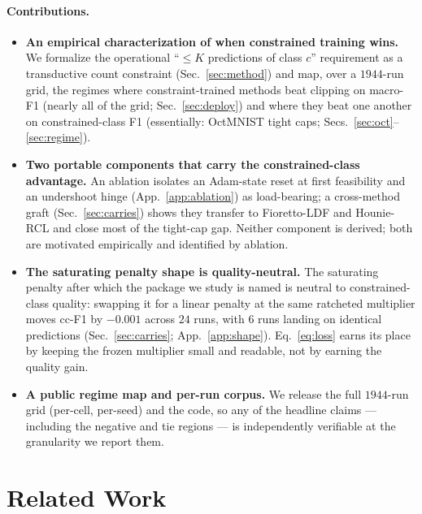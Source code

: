 \documentclass[10pt]{article}
\begin{document}
\paragraph{Contributions.}
\begin{itemize}\itemsep2pt
  \item \textbf{An empirical characterization of when constrained training
  wins.} We formalize the operational ``$\le K$ predictions of class $c$''
  requirement as a transductive count constraint (Sec.~\ref{sec:method}) and
  map, over a $1944$-run grid, the regimes where constraint-trained methods
  beat clipping on macro-F1 (nearly all of the grid;
  Sec.~\ref{sec:deploy}) and where they beat one another on
  constrained-class F1 (essentially: OctMNIST tight caps;
  Secs.~\ref{sec:oct}--\ref{sec:regime}).
  \item \textbf{Two portable components that carry the constrained-class advantage.}
  An ablation isolates an Adam-state reset at first feasibility and an
  undershoot hinge (App.~\ref{app:ablation}) as load-bearing;
  a cross-method graft (Sec.~\ref{sec:carries}) shows they transfer to
  Fioretto-LDF \citep{fioretto2020lagrangian} and Hounie-RCL
  \citep{hounie2023resilient} and close most of the tight-cap gap. Neither
  component is derived; both are motivated empirically and identified by
  ablation.
  \item \textbf{The saturating penalty shape is quality-neutral.} The
  saturating penalty after which the package we study is named is neutral
  to constrained-class quality: swapping it for a linear penalty at the
  same ratcheted multiplier moves cc-F1 by $-0.001$ across $24$ runs,
  with $6$ runs landing on identical predictions
  (Sec.~\ref{sec:carries}; App.~\ref{app:shape}). Eq.~\eqref{eq:loss}
  earns its place by keeping the frozen multiplier small and readable,
  not by earning the quality gain.
  \item \textbf{A public regime map and per-run corpus.} We release the
  full $1944$-run grid (per-cell, per-seed) and the code, so any of the
  headline claims --- including the negative and tie regions --- is
  independently verifiable at the granularity we report them.
\end{itemize}

\section{Related Work}
\label{sec:related}
\end{document}
